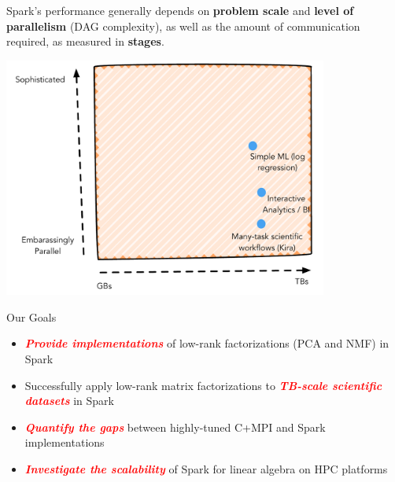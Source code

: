 \documentclass[xcolor=x11names,compress,ignorenonframetext,10pt]{beamer}
\renewcommand{\(}{\begin{columns}}
\renewcommand{\)}{\end{columns}}
\newcommand{\<}[1]{\begin{column}{#1}}
\renewcommand{\>}{\end{column}}
\newcommand{\redemphasis}[1]{\textbf{\textit{\textcolor{red}{#1}}}}
\begin{document}
\begin{frame}
  Spark's performance generally depends on \textbf{problem scale} and \textbf{level of parallelism} (DAG complexity),
  as well as the amount of communication required, as measured in \textbf{stages}. 
  \begin{center}
  \includegraphics[width=0.8\textwidth]{figures/spark/spark-usage}
  \end{center}
\end{frame}

\begin{frame}{Our Goals}
  \begin{itemize}
    \item \redemphasis{Provide implementations} of low-rank factorizations (PCA and NMF) in Spark
    \item Successfully apply low-rank matrix factorizations to \redemphasis{TB-scale scientific datasets} in Spark
    \item \redemphasis{Quantify the gaps} between highly-tuned C+MPI and Spark implementations
    \item \redemphasis{Investigate the scalability} of Spark for linear algebra on HPC platforms
  \end{itemize}
\end{frame}
\end{document}
